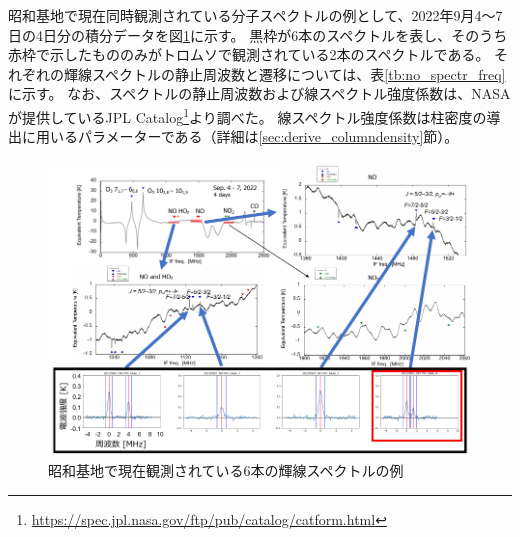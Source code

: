 昭和基地で現在同時観測されている分子スペクトルの例として、2022年9月4〜7日の4日分の積分データを図\ref{fig:NO_spectr}に示す。
黒枠が6本のスペクトルを表し、そのうち赤枠で示したもののみがトロムソで観測されている2本のスペクトルである。
それぞれの輝線スペクトルの静止周波数と遷移については、表\ref{tb:no_spectr_freq}に示す。
なお、スペクトルの静止周波数および線スペクトル強度係数は、NASAが提供しているJPL Catalog\footnote{\url{https://spec.jpl.nasa.gov/ftp/pub/catalog/catform.html}}より調べた。
線スペクトル強度係数は柱密度の導出に用いるパラメーターである（詳細は\ref{sec:derive_columndensity}節）。
\begin{figure}[htbp]
    \centering
    \includegraphics[width=\linewidth]{master_thesis_contents/master_thesis_fig/NO_spectr.pdf}
    \caption{昭和基地で現在観測されている6本の輝線スペクトルの例}
    \label{fig:NO_spectr}
\end{figure}
